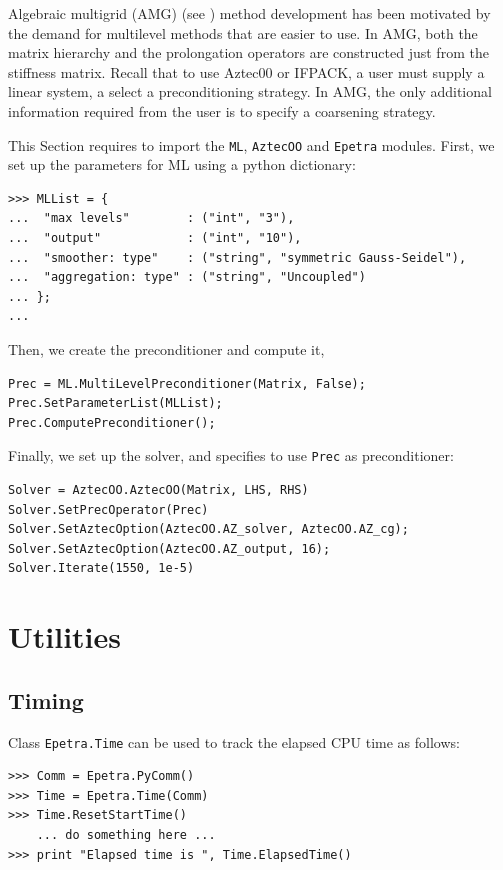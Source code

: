 \documentclass[10pt,relax]{SANDreport}
\begin{document}
Algebraic multigrid (AMG)  (see \cite[Section 8]{Briggs2000}) method
development has been motivated by the demand for multilevel methods that are
easier to use.  In AMG, both the matrix hierarchy and the prolongation
operators are constructed just from the stiffness matrix.  Recall that to use
Aztec00 or IFPACK,  a user must supply a linear system, a select a
preconditioning strategy.  In AMG, the only additional information required
from the user is to specify a coarsening strategy.

This Section requires to import the {\tt ML}, {\tt AztecOO} and {\tt Epetra}
modules. First, we set up the parameters for ML using a python dictionary:
\begin{verbatim}
>>> MLList = {
...  "max levels"        : ("int", "3"),
...  "output"            : ("int", "10"),
...  "smoother: type"    : ("string", "symmetric Gauss-Seidel"),
...  "aggregation: type" : ("string", "Uncoupled")
... };
... 
\end{verbatim}
Then, we create the preconditioner and compute it,
\begin{verbatim}
Prec = ML.MultiLevelPreconditioner(Matrix, False);
Prec.SetParameterList(MLList);
Prec.ComputePreconditioner();
\end{verbatim}
Finally, we set up the solver, and specifies to use \verb!Prec! as
preconditioner:
\begin{verbatim}
Solver = AztecOO.AztecOO(Matrix, LHS, RHS)
Solver.SetPrecOperator(Prec)
Solver.SetAztecOption(AztecOO.AZ_solver, AztecOO.AZ_cg);
Solver.SetAztecOption(AztecOO.AZ_output, 16);
Solver.Iterate(1550, 1e-5)
\end{verbatim}

\section{Utilities}
\label{sec:utilities}

\subsection{Timing}

Class {\tt Epetra.Time} can be used to track the elapsed CPU time as follows:
\begin{verbatim}
>>> Comm = Epetra.PyComm()
>>> Time = Epetra.Time(Comm)
>>> Time.ResetStartTime()
    ... do something here ...
>>> print "Elapsed time is ", Time.ElapsedTime()
\end{verbatim}
\end{document}
